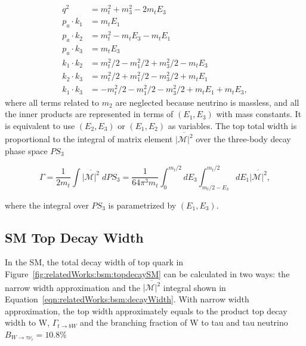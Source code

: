 \begin{equation}
\begin{split}
	q^2 &=  m_t^2 + m_3^2  -2 m_t E_3  \\
    p_a \cdot k_1 &= m_t E_1 \\
    p_a \cdot k_2 &= m_t^2  -m_t E_3-m_t E_1  \\
    p_a \cdot k_3 &= m_t E_3 \\
    k_1 \cdot k_2 &= m_t^2/2 - m_1^2/2 + m_3^2/2 - m_t E_3 \\
    k_2\cdot k_3 &=  m_t^2/2 + m_1^2/2 - m_3^2/2 + m_t E_1 \\
    k_1\cdot k_3 &=   -m_t^2/2 - m_1^2/2 - m_3^2/2 + m_t E_1 + m_t E_3 ,
\end{split}
\label{eqn:relatedWorks:bsm:innerProduct}
\end{equation}
\noindent where all terms related to $m_2$ are neglected because neutrino is massless, and all the inner products are represented in terms of $ ( E_1,E_3 )$ with mass constants. It is equivalent to use $ ( E_2,E_3 )$ or $ ( E_1,E_2 )$ as variables. The top total width is proportional to the integral of matrix element $\overline{ |\mathcal{M}|^2 } $ over the three-body decay phase space $PS_3$

\begin{equation}
	\Gamma = \frac{1}{2 m_t} \int \overline{ |\mathcal{M}|^2 } \; dPS_3 = \frac{1}{64 \pi^3 m_t} \int_{0}^{m_t/2} dE_3 \int_{m_t/2-E_3}^{m_t/2} dE_1 \overline{ |\mathcal{M}|^2 } ,
    \label{eqn:relatedWorks:bsm:decayWidth}
\end{equation}




\noindent where the integral over $PS_3$ is parametrized by  $ ( E_1,E_3 )$.



\subsection{SM Top Decay Width}
\label{sec:relatedWorks:bsm:smTopDecay}

In the SM, the total decay width of top quark in Figure~\ref{fig:relatedWorks:bsm:topdecaySM} can be calculated in two ways: the narrow width approximation and the $\overline{ |\mathcal{M}|^2 } $ integral shown in Equation~\ref{eqn:relatedWorks:bsm:decayWidth}. With narrow width approximation, the top width approximately equals to the product top decay width to W, $\Gamma_{t\to b W}$ and the branching fraction of W to tau and tau neutrino $B_{W\to \tau \nu_\tau} = 10.8\%$

